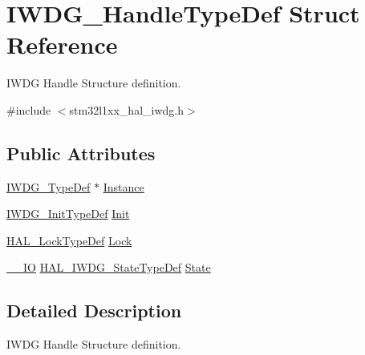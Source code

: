 \hypertarget{struct_i_w_d_g___handle_type_def}{\section{I\-W\-D\-G\-\_\-\-Handle\-Type\-Def Struct Reference}
\label{struct_i_w_d_g___handle_type_def}
}


I\-W\-D\-G Handle Structure definition.  




{\ttfamily \#include $<$stm32l1xx\-\_\-hal\-\_\-iwdg.\-h$>$}

\subsection*{Public Attributes}
\begin{DoxyCompactItemize}
\item 
\hyperlink{struct_i_w_d_g___type_def}{I\-W\-D\-G\-\_\-\-Type\-Def} $\ast$ \hyperlink{struct_i_w_d_g___handle_type_def_ad3fd4c46ef1e9b842328ca4e3290708e}{Instance}
\item 
\hyperlink{struct_i_w_d_g___init_type_def}{I\-W\-D\-G\-\_\-\-Init\-Type\-Def} \hyperlink{struct_i_w_d_g___handle_type_def_ae308075a425af205912feb4059c6f213}{Init}
\item 
\hyperlink{stm32l1xx__hal__def_8h_ab367482e943333a1299294eadaad284b}{H\-A\-L\-\_\-\-Lock\-Type\-Def} \hyperlink{struct_i_w_d_g___handle_type_def_a89ec8a98b121ce7167707d4af23a822d}{Lock}
\item 
\hyperlink{core__sc300_8h_aec43007d9998a0a0e01faede4133d6be}{\-\_\-\-\_\-\-I\-O} \hyperlink{group___i_w_d_g___exported___types_ga61699dc6f24a3edecddd16018560d0e5}{H\-A\-L\-\_\-\-I\-W\-D\-G\-\_\-\-State\-Type\-Def} \hyperlink{struct_i_w_d_g___handle_type_def_ad0e66d3745ab620bd7f6138880a8f299}{State}
\end{DoxyCompactItemize}


\subsection{Detailed Description}
I\-W\-D\-G Handle Structure definition. 


